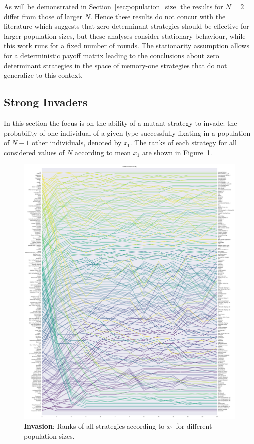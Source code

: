 \documentclass{article}
\begin{document}
As will be demonstrated in Section~\ref{sec:population_size} the results for
\(N=2\) differ from those of larger $N$. Hence these results do not concur with
the literature which suggests that zero determinant strategies should be
effective for larger population sizes, but these analyses consider stationary
behaviour, while this work runs for a fixed number of rounds. \cite{stewart2013extortion}
The stationarity assumption allows for a deterministic payoff matrix
leading to the conclusions about zero determinant strategies in the space
of memory-one strategies that do not generalize to this context.


\subsection{Strong Invaders}\label{sec:strong_invaders}

In this section the focus is on the ability of a mutant strategy to invade: the
probability of one individual of a given type successfully fixating in a
population of \(N - 1\) other individuals, denoted by \(x_1\).
The ranks of each strategy for all considered values of \(N\) according to mean
\(x_1\) are shown in Figure~\ref{fig:ranks_v_size_invade}.

\begin{figure}[!hbtp]
    \centering
    \includegraphics[height=.9\textheight]{./img/average_rank_vs_population_size_invade.pdf}
    \caption{\textbf{Invasion}: Ranks of all strategies according to \(x_1\) for different
    population sizes.}
    \label{fig:ranks_v_size_invade}
\end{figure}
\end{document}
